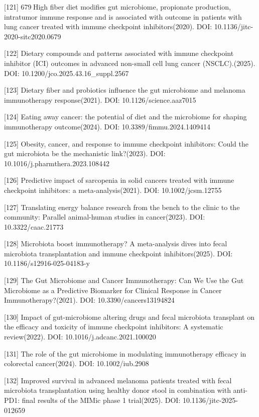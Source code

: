 \documentclass[11pt]{article}
\begin{document}
{[}121{]} 679 High fiber diet modifies gut microbiome, propionate production, intratumor immune response and is associated with outcome in patients with lung cancer treated with immune checkpoint inhibitors(2020). DOI: 10.1136/jitc-2020-sitc2020.0679

{[}122{]} Dietary compounds and patterns associated with immune checkpoint inhibitor (ICI) outcomes in advanced non-small cell lung cancer (NSCLC).(2025). DOI: 10.1200/jco.2025.43.16\_suppl.2567

{[}123{]} Dietary fiber and probiotics influence the gut microbiome and melanoma immunotherapy response(2021). DOI: 10.1126/science.aaz7015

{[}124{]} Eating away cancer: the potential of diet and the microbiome for shaping immunotherapy outcome(2024). DOI: 10.3389/fimmu.2024.1409414

{[}125{]} Obesity, cancer, and response to immune checkpoint inhibitors: Could the gut microbiota be the mechanistic link?(2023). DOI: 10.1016/j.pharmthera.2023.108442

{[}126{]} Predictive impact of sarcopenia in solid cancers treated with immune checkpoint inhibitors: a meta-analysis(2021). DOI: 10.1002/jcsm.12755

{[}127{]} Translating energy balance research from the bench to the clinic to the community: Parallel animal-human studies in cancer(2023). DOI: 10.3322/caac.21773

{[}128{]} Microbiota boost immunotherapy? A meta-analysis dives into fecal microbiota transplantation and immune checkpoint inhibitors(2025). DOI: 10.1186/s12916-025-04183-y

{[}129{]} The Gut Microbiome and Cancer Immunotherapy: Can We Use the Gut Microbiome as a Predictive Biomarker for Clinical Response in Cancer Immunotherapy?(2021). DOI: 10.3390/cancers13194824

{[}130{]} Impact of gut-microbiome altering drugs and fecal microbiota transplant on the efficacy and toxicity of immune checkpoint inhibitors: A systematic review(2022). DOI: 10.1016/j.adcanc.2021.100020

{[}131{]} The role of the gut microbiome in modulating immunotherapy efficacy in colorectal cancer(2024). DOI: 10.1002/iub.2908

{[}132{]} Improved survival in advanced melanoma patients treated with fecal microbiota transplantation using healthy donor stool in combination with anti-PD1: final results of the MIMic phase 1 trial(2025). DOI: 10.1136/jitc-2025-012659
\end{document}
